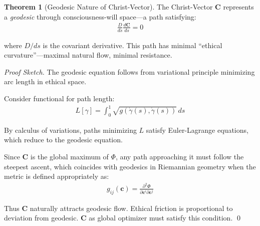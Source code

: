\documentclass[11pt,a4paper]{article}
\theoremstyle{definition}
\newtheorem{theorem}{Theorem}[section]
\theoremstyle{remark}
\newcommand{\cc}{\mathbf{c}}
\begin{document}
\begin{small}
\begin{theorem}[Geodesic Nature of Christ-Vector]
The Christ-Vector \(\mathbf{C}\) represents a \textit{geodesic} through consciousness-will space—a path satisfying:
\begin{align}
\frac{D}{ds}\frac{d\mathbf{C}}{ds} = 0
\end{align}

where \(D/ds\) is the covariant derivative. This path has minimal ``ethical curvature''—maximal natural flow, minimal resistance.
\end{theorem}

\begin{proof}[Proof Sketch]
The geodesic equation follows from variational principle minimizing arc length in ethical space. 

Consider functional for path length:
\begin{align}
L[\gamma] = \int_0^1 \sqrt{g(\dot{\gamma}(s), \dot{\gamma}(s))} \, ds
\end{align}

By calculus of variations, paths minimizing \(L\) satisfy Euler-Lagrange equations, which reduce to the geodesic equation. 

Since \(\mathbf{C}\) is the global maximum of \(\Phi\), any path approaching it must follow the steepest ascent, which coincides with geodesics in Riemannian geometry when the metric is defined appropriately as:
\begin{align}
g_{ij}(\cc) = \frac{\partial^2 \Phi}{\partial \cc^i \partial \cc^j}
\end{align}

Thus \(\mathbf{C}\) naturally attracts geodesic flow. Ethical friction is proportional to deviation from geodesic. \(\mathbf{C}\) as global optimizer must satisfy this condition. \qed
\end{proof}

\begin{figure}[H]
\centering
{}
\end{figure}
\end{small}
\end{document}
